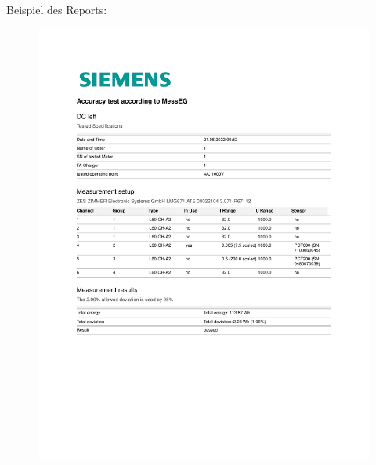         \newpage
        Beispiel des Reports: 
        \begin{figure}[H]
            \centering
            \includegraphics[width=1\textwidth]{./Report.pdf}
            \label{fig:flow around cylinder}
        \end{figure}